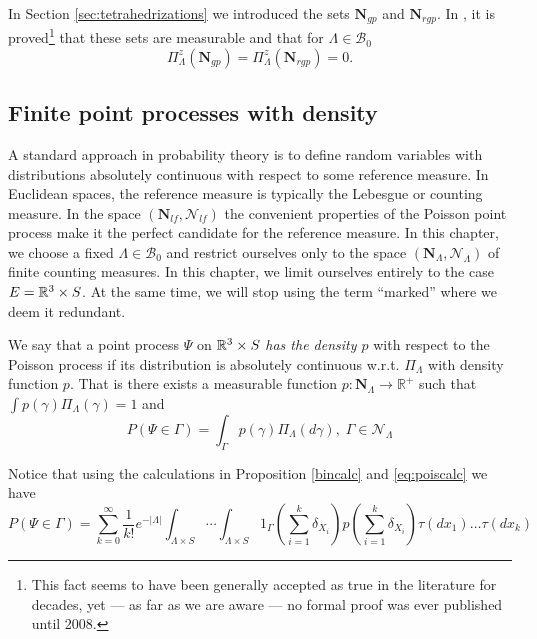 \begin{remark}
	In Section \ref{sec:tetrahedrizations} we introduced the sets $\mathbf N_{gp}$ and $\mathbf N_{rgp}$. In \cite{Zessin2008}, it is proved\footnote{This fact seems to have been generally accepted as true in the literature for decades, yet --- as far as we are aware --- no formal proof was ever published until 2008.} that these sets are measurable and that for $\Lambda \in \mathcal B_0$
	$$\Pi^z_{\Lambda}(\mathbf N_{gp}) = \Pi^z_{\Lambda}(\mathbf N_{rgp})=0.$$
\end{remark}



\subsection{Finite point processes with density}\label{sec:densityPP}
A standard approach in probability theory is to define random variables with distributions absolutely continuous with respect to some reference measure. In Euclidean spaces, the reference measure is typically the Lebesgue or counting measure. In the space $(\mathbf N_{lf},\mathcal N_{lf})$ the convenient properties of the Poisson point process make it the perfect candidate for the reference measure. In this chapter, we choose a fixed $\Lambda \in \mathcal B_0$ and restrict ourselves only to the space $(\mathbf N_\Lambda,\mathcal N_\Lambda)$ of finite counting measures. 
In this chapter, we limit ourselves entirely to the case $E={\mathbb R^3} \times S$. At the same time, we will stop using the term ``marked'' where we deem it redundant. 

\begin{definition}
We say that a point process $\Psi$ on ${\mathbb R^3} \times S$ \textit{has the density $p$} with respect to the Poisson process if its distribution is absolutely continuous w.r.t. $\Pi_\Lambda$ with density function $p$. That is there exists a measurable function $p: \mathbf N_\Lambda \to \mathbb R^+$ such that $\int p(\gamma) \Pi_\Lambda (\gamma)=1$ and
$$P(\Psi \in \Gamma) = \int_\Gamma p(\gamma) \Pi_\Lambda(d\gamma), \; \Gamma \in \mathcal N_{\Lambda}$$
\end{definition}

Notice that using the calculations in Proposition \ref{bincalc} and \eqref{eq:poiscalc} we have
$$
P(\Psi \in \Gamma) = \sum^\infty_{k=0} \frac{1}{k!} e^{-|\Lambda|} \int_{\Lambda\times S} \cdots \int_{\Lambda\times S} 1_{\Gamma} \left(\sum^k_{i=1} \delta_{X_i}\right) p\left(\sum^k_{i=1} \delta_{X_i}\right) \tau(dx_1) \dots \tau(dx_k)
$$

